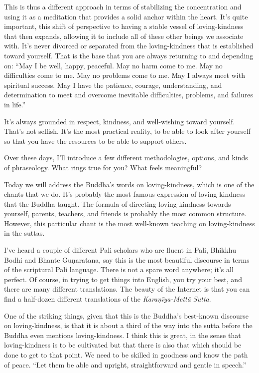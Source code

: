 This is thus a different approach in terms of stabilizing the
concentration and using it as a meditation that provides a solid anchor
within the heart. It’s quite important, this shift of perspective to
having a stable vessel of loving-kindness that then expands, allowing it
to include all of these other beings we associate with. It’s never
divorced or separated from the loving-kindness that is established
toward yourself. That is the base that you are always returning to and
depending on: “May I be well, happy, peaceful. May no harm come to me.
May no difficulties come to me. May no problems come to me. May I always
meet with spiritual success. May I have the patience, courage,
understanding, and determination to meet and overcome inevitable
difficulties, problems, and failures in life.”

It’s always grounded in respect, kindness, and well-wishing toward
yourself. That’s not selfish. It’s the most practical reality, to be
able to look after yourself so that you have the resources to be able to
support others.

Over these days, I’ll introduce a few different methodologies, options,
and kinds of phraseology. What rings true for you? What feels
meaningful?

Today we will address the Buddha’s words on loving-kindness, which is
one of the chants that we do. It’s probably the most famous expression
of loving-kindness that the Buddha taught. The formula of directing
loving-kindness towards yourself, parents, teachers, and friends is
probably the most common structure. However, this particular chant is
the most well-known teaching on loving-kindness in the suttas.

I’ve heard a couple of different Pali scholars who are fluent in Pali,
Bhikkhu Bodhi and Bhante Guṇaratana, say this is the most beautiful
discourse in terms of the scriptural Pali language. There is not a spare
word anywhere; it’s all perfect. Of course, in trying to get things into
English, you try your best, and there are many different translations.
The beauty of the Internet is that you can find a half-dozen different
translations of the \emph{Karaṇīya-Mettā Sutta}.

One of the striking things, given that this is the Buddha’s best-known
discourse on loving-kindness, is that it is about a third of the way
into the sutta before the Buddha even mentions loving-kindness. I think
this is great, in the sense that loving-kindness is to be cultivated but
that there is also that which should be done to get to that point. We
need to be skilled in goodness and know the path of peace. “Let them be
able and upright, straightforward and gentle in speech.”

